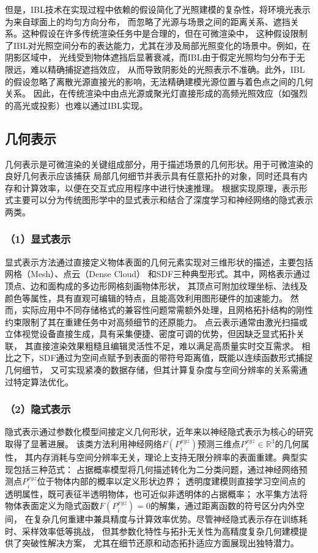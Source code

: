 但是，IBL技术在实现过程中依赖的假设简化了光照建模的复杂性，将环境光表示为来自球面上的均匀方向分布，
而忽略了光源与场景之间的距离关系、遮挡关系。这种假设在许多传统渲染任务中是合理的，但在可微渲染中，
这种假设限制了IBL对光照空间分布的表达能力，尤其在涉及局部光照变化的场景中。例如，在阴影区域中，
光线受到物体遮挡后显著衰减，而IBL由于假定光照均匀分布于无限远，难以精确捕捉遮挡效应，
从而导致阴影处的光照表示不准确。此外，IBL的假设忽略了离散光源直接光的影响，无法精确建模光源位置与着色点之间的几何关系。
因此，在传统渲染中由点光源或聚光灯直接形成的高频光照效应（如强烈的高光或投影）也难以通过IBL实现。

\subsection{几何表示} \label{sec:geo_representation}
几何表示是可微渲染的关键组成部分，用于描述场景的几何形状。用于可微渲染的良好几何表示应该捕获
局部几何细节并表示具有任意拓扑的对象，同时还具有内存和计算效率，以便在交互式应用程序中进行快速推理。
根据实现原理，表示形式主要可以分为传统图形学中的显式表示和结合了深度学习和神经网络的隐式表示两类。

\subsubsection*{（1）显式表示} 

显式表示方法通过直接定义物体表面的几何元素实现对三维形状的描述，主要包括网格（Mesh）、点云（Dense Cloud）
和SDF三种典型形式。其中，网格表示通过顶点、边和面构成的多边形网格刻画物体形状，
其顶点可附加纹理坐标、法线及颜色等属性，具有直观可编辑的特点，且能高效利用图形硬件的加速能力。
然而，实际应用中不同存储格式的兼容性问题常需额外处理，且网格拓扑结构的刚性约束限制了其在重建任务中对高频细节的还原能力。
点云表示通常由激光扫描或立体视觉设备直接生成，具有采集便捷、密度可调的优势，但因缺乏显式拓扑关联，
其直接渲染效果粗糙且编辑灵活性不足，难以满足高质量实时交互需求。
相比之下，SDF通过为空间点赋予到表面的带符号距离值，既能以连续函数形式捕捉几何细节，
又可实现紧凑的数据存储，但其计算复杂度与空间分辨率的关系需通过特定算法优化。

\subsubsection*{（2）隐式表示} 

隐式表示通过参数化模型间接定义几何形状，近年来以神经隐式表示为核心的研究取得了显著进展。
该类方法利用神经网络$F(P_i^{xyz})$预测三维点$P_i^{xyz}\in\mathbb{R}^3$的几何属性，
其内存消耗与空间分辨率无关，理论上支持无限分辨率的表面重建。典型实现包括三种范式：
占据概率模型将几何描述转化为二分类问题，通过神经网络预测点$P_i^{xyz}$位于物体内部的概率以定义形状边界；
透明度建模则直接学习空间点的透明属性，既可表征半透明物体，也可近似非透明体的占据概率；
水平集方法将物体表面定义为隐式函数$F(P_i^{xyz})=0$的解集，通过距离函数的符号区分内外空间，
在复杂几何重建中兼具精度与计算效率优势。尽管神经隐式表示存在训练耗时、采样效率低等挑战，
但其参数化特性与拓扑无关性为高精度复杂几何建模提供了突破性解决方案，
尤其在细节还原和动态拓扑适应方面展现出独特潜力。

